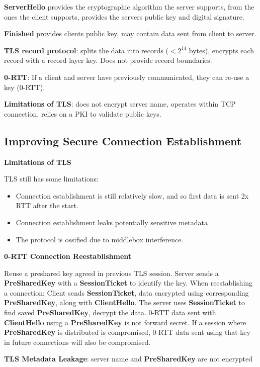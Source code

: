 \documentclass{article}
\begin{document}
\textbf{ServerHello} provides the cryptographic algorithm the server supports, from the ones the client supports, provides the servers public key and digital signature.

\textbf{Finished} provides clients public key, may contain data sent from client to server.

\textbf{TLS record protocol}: splits the data into records ($< 2^{14}$ bytes), encrypts each record with a record layer key. Does not provide record boundaries.

\textbf{0-RTT}: If a client and server have previously communicated, they can re-use a key (0-RTT).

\textbf{Limitations of TLS}: does not encrypt server name, operates within TCP connection, relies on a PKI to validate public keys.


\clearpage

\subsection*{Improving Secure Connection Establishment}

\textbf{Limitations of TLS}

TLS still has some limitations:
\begin{itemize}
    \item Connection establishment is still relatively slow, and so first data is sent 2x RTT after the start.
    \item Connection establishment leaks potentially sensitive metadata
    \item The protocol is ossified due to middlebox interference.
\end{itemize}

\textbf{0-RTT Connection Reestablishment}

Reuse a preshared key agreed in previous TLS session.
Server sends a \textbf{PreSharedKey} with a \textbf{SessionTicket} to identify the key.
When reestablishing a connection: Client sends \textbf{SessionTicket}, data encrypted using corresponding
\textbf{PreSharedKey}, along with \textbf{ClientHello}. The server uses \textbf{SessionTicket} to find saved \textbf{PreSharedKey},
decrypt the data.
0-RTT data sent with \textbf{ClientHello} using a \textbf{PreSharedKey} is not forward secret.
If a session where \textbf{PreSharedKey} is distributed is compromised,
0-RTT data sent using that key in future connections will also be compromised.

\textbf{TLS Metadata Leakage}: server name and \textbf{PreSharedKey} are not encrypted
\end{document}
